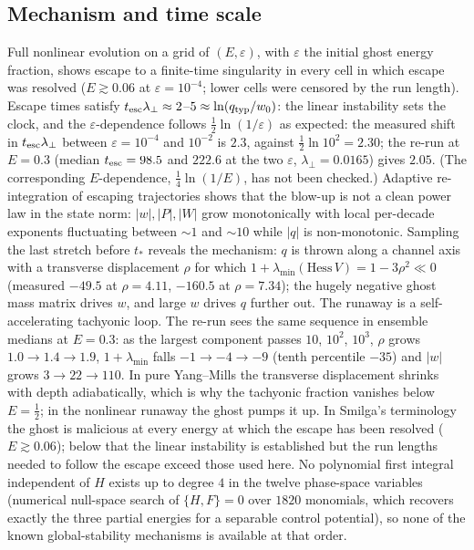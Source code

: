 \documentclass[11pt,a4paper]{article}
\newcommand{\Hess}{\mathrm{Hess}\,}
\newcommand{\esc}{{\rm esc}}
\begin{document}
\subsection{Mechanism and time scale}

Full nonlinear evolution on a grid of $(E,\varepsilon)$, with $\varepsilon$ the initial ghost
energy fraction, shows escape to a finite-time singularity in every cell in which escape was
resolved ($E\gtrsim0.06$ at $\varepsilon=10^{-4}$; lower cells were censored by the run length).
Escape times satisfy $t_\esc\lambda_\perp\approx2$--$5\approx\ln(q_{\rm typ}/w_0)$: the linear
instability sets the clock, and the $\varepsilon$-dependence follows
$\tfrac12\ln(1/\varepsilon)$ as expected: the measured shift in $t_\esc\lambda_\perp$ between
$\varepsilon=10^{-4}$ and $10^{-2}$ is $2.3$, against $\tfrac12\ln10^2=2.30$; the re-run at
$E=0.3$ (median $t_\esc=98.5$ and $222.6$ at the two $\varepsilon$, $\lambda_\perp=0.0165$)
gives $2.05$. (The corresponding $E$-dependence, $\tfrac14\ln(1/E)$, has not been checked.)
Adaptive re-integration of escaping trajectories shows that the blow-up is not a clean power law
in the state norm: $|w|,|P|,|W|$ grow monotonically with local per-decade exponents fluctuating
between $\sim1$ and $\sim10$ while $|q|$ is non-monotonic. Sampling the last stretch before
$t_*$ reveals the mechanism: $q$ is thrown along a channel axis with a transverse displacement
$\rho$ for which $1+\lambda_{\min}(\Hess V)=1-3\rho^2\ll0$ (measured $-49.5$ at $\rho=4.11$,
$-160.5$ at $\rho=7.34$); the hugely negative ghost mass matrix drives $w$, and large $w$ drives
$q$ further out. The runaway is a self-accelerating tachyonic loop. The re-run sees the same
sequence in ensemble medians at $E=0.3$: as the largest component passes $10$, $10^2$, $10^3$,
$\rho$ grows $1.0\to1.4\to1.9$, $1+\lambda_{\min}$ falls $-1\to-4\to-9$ (tenth percentile
$-35$) and $|w|$ grows $3\to22\to110$. In pure Yang--Mills the
transverse displacement shrinks with depth adiabatically, which is why the tachyonic fraction
vanishes below $E=\tfrac12$; in the nonlinear runaway the ghost pumps it up. In Smilga's
terminology \cite{Smilga} the ghost is malicious at every energy at which the escape has been
resolved ($E\gtrsim0.06$); below that the linear instability is established but the run lengths
needed to follow the escape exceed those used here. No polynomial first integral independent of $H$ exists up to degree $4$ in the twelve
phase-space variables (numerical null-space search of $\{H,F\}=0$ over $1820$ monomials, which
recovers exactly the three partial energies for a separable control potential), so none of the
known global-stability mechanisms \cite{DMV22,KLS14} is available at that order.
\end{document}
